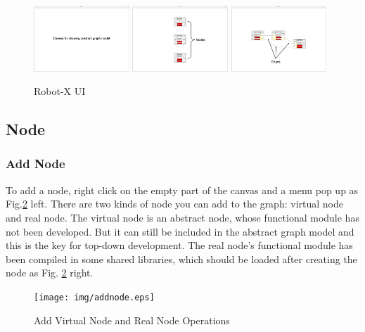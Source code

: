 \documentclass[a4paper,10pt]{book}
\begin{document}
\begin{figure}
 \centering
 \includegraphics[width=0.32\textwidth]{img/RobotXUI.eps}
  \includegraphics[width=0.32\textwidth]{img/RobotXnode.eps}
   \includegraphics[width=0.32\textwidth]{img/RobotXedge.eps}
 \caption{Robot-X UI}
 \label{fig:robotxui}
\end{figure}

\subsection{Node}

\subsubsection{Add Node}

To add a node, right click on the empty part of the canvas and a menu pop up as Fig.\ref{fig:addnode} left. There are two kinds of node you can add to the graph: virtual node and real node. The virtual node is an abstract node, whose functional module has not been developed. But it can still be included in the abstract graph model and this is the key for top-down development. The real node's functional module has been compiled in some shared libraries, which should be loaded after creating the node as Fig. \ref{fig:addnode} right.

\begin{figure}
 \centering
 \texttt{[image: img/addnode.eps]}
 \caption{Add Virtual Node and Real Node Operations}
 \label{fig:addnode}
\end{figure}
\end{document}
